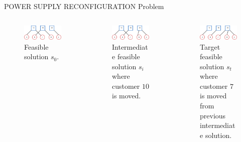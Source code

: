 \begin{frame}{POWER SUPPLY RECONFIGURATION Problem}
\begin{columns}
    \begin{column}{0.3\textwidth}
        \begin{figure}
        \centering
        \includegraphics[width=1.1\textwidth]{img/ps2.pdf}
        \caption{Feasible solution $s_0$.\hfill \break \hfill \break \hfill \break \hfill \break}
        \label{fig:circle}
        \end{figure}
    \end{column}
    \begin{column}{0.3\textwidth}
        \begin{figure}
        \centering
        \includegraphics[width=1.1\textwidth]{img/ps3.pdf}
        \caption{Intermediate feasible solution $s_i$ where customer $10$ is moved.\hfill \break \hfill \break}
        \label{fig:circle}
        \end{figure}
    \end{column}
    \begin{column}{0.3\textwidth}
        \begin{figure}
        \centering
        \includegraphics[width=1.1\textwidth]{img/ps4.pdf}
        \caption{Target feasible solution $s_t$ where customer $7$ is moved from previous intermediate solution.\hfill \break}
        \label{fig:circle}
        \end{figure}
    \end{column}
\end{columns}


\end{frame}
